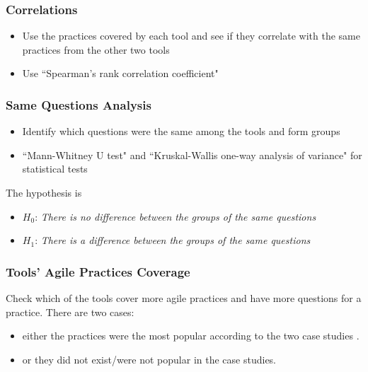 \clearpage

%

\subsubsection*{Correlations}

\begin{itemize}
	\item Use the practices covered by each tool and see if they correlate with the same practices from the other two tools
	\item Use ``Spearman's rank correlation coefficient"
\end{itemize}

\clearpage

\subsubsection*{Same Questions Analysis}

\begin{itemize}
	\item Identify which questions were the same among the tools and form groups
	\item ``Mann-Whitney U test" and ``Kruskal-Wallis one-way analysis of variance" for statistical tests
\end{itemize}

The hypothesis is

\begin{itemize}[label={}]
	\item $H_0$: \textit{There is no difference between the groups of the same questions}
	\item $H_1$: \textit{There is a difference between the groups of the same questions}
\end{itemize}

\clearpage

\subsubsection*{Tools' Agile Practices Coverage}

Check which of the tools cover more agile practices and have more questions for a practice. There are two cases:

\begin{itemize}
	\item either the practices were the most popular according to the two case studies \cite{Williams_Microsoft, laurie_williams}.
	\item or they did not exist/were not popular in the case studies.
\end{itemize}

\clearpage
